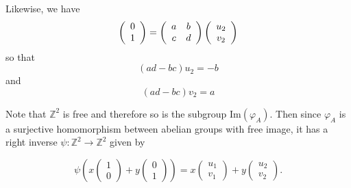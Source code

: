 \documentclass{article}
\begin{document}
\begin{Answer}
\begin{enumerate}
{\begin{itemize}
{        Likewise, we have
        $$
        \left(\begin{array}{c}
          0 \\ 1
        \end{array}\right) =
        \left(\begin{array}{c c}
          a & b \\ c & d
        \end{array}\right)
        \left(\begin{array}{c}
          u_2 \\ v_2
        \end{array}\right)
        $$
        so that
        $$
        (ad - bc)u_2 = -b
        $$
        and
        $$
        (ad - bc)v_2 = a
        $$

        Note that $\mathbb{Z}^2$
        is free and therefore so is the subgroup $\mathrm{Im}(\varphi_A)$.
        Then since $\varphi_A$ is a surjective homomorphism between
        abelian groups with free image, it has a right inverse
        $\psi : \mathbb{Z}^2 \to \mathbb{Z}^2$ given by

        $$
        \psi\left(
          x\left(\begin{array}{c}
            1 \\ 0
          \end{array}\right)
          +
          y\left(\begin{array}{c}
            0 \\ 1
          \end{array}\right)
        \right) =
        x\left(\begin{array}{c}
          u_1 \\ v_1
        \end{array}\right)
        +
        y\left(\begin{array}{c}
          u_2 \\ v_2
        \end{array}\right).
        $$

}
\end{itemize}}
\end{enumerate}
\end{Answer}
\end{document}
